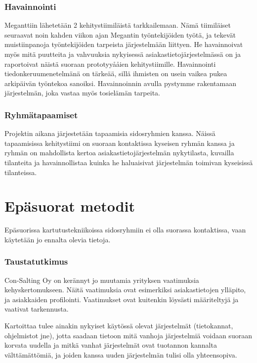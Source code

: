         \subsubsection*{Havainnointi}

            Meganttiin lähetetään 2 kehitystiimiläistä tarkkailemaan. Nämä tiimiläiset seuraavat noin kahden viikon ajan Megantin työntekijöiden työtä, ja tekevät 
            muistiinpanoja työntekijöiden tarpeista järjestelmään liittyen. He havainnoivat myös mitä puutteita ja vahvuuksia nykyisessä asiakastietojärjestelmässä on ja raportoivat näistä suoraan prototyyååien kehitystiimille. Havainnointi tiedonkeruumenetelmänä on tärkeää, sillä ihmisten on usein vaikea pukea arkipäivän työntekoa sanoiksi. Havainnoinnin avulla pystymme rakentamaan järjestelmän, joka vastaa myös tosielämän tarpeita.


        \subsubsection*{Ryhmätapaamiset}

            Projektin aikana järjestetään tapaamisia sidosryhmien kanssa. Näissä tapaamisissa kehitystiimi on suoraan kontaktissa kyseisen ryhmän kanssa ja ryhmän on mahdollista kertoa asiakastietojärjestelmän nykytilasta, kuvailla tilanteita ja havainnollistaa kuinka he haluaisivat järjestelmän toimivan kyseisissä tilanteissa.


    \section*{Epäsuorat metodit}

        Epäsuorissa kartutustekniikoissa sidosryhmiin ei olla suorassa kontaktissa, vaan käytetään jo ennalta olevia tietoja.

        \subsubsection*{Taustatutkimus}

        Con-Salting Oy on kerännyt jo muutamia yrityksen vaatimuksia kehyskertomukseen. 
        Näitä vaatimuksia ovat esimerkiksi asiakastietojen ylläpito, ja asiakkaiden profilointi.
        Vaatimukset ovat kuitenkin löysästi määriteltyjä ja vaativat tarkennusta.

	Kartoittaa tulee ainakin nykyiset käytössä olevat järjestelmät (tietokannat, ohjelmistot jne), jotta saadaan tietoon mitä vanhoja järjestelmiä voidaan suoraan korvata uudella ja mitkä vanhat järjestelmät ovat tuotannon kannalta välttämättömiä, ja joiden kanssa uuden järjestelmän tulisi olla yhteensopiva.

